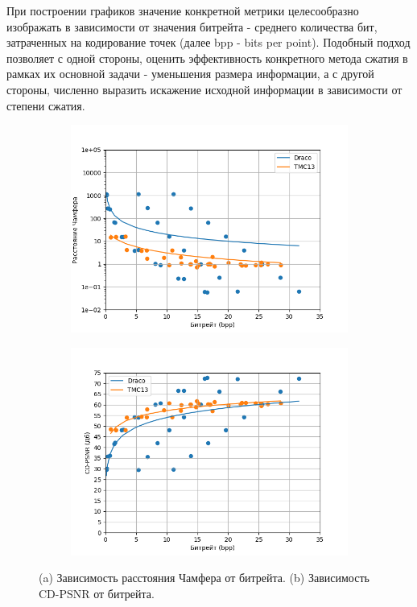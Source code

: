 При построении графиков значение конкретной метрики целесообразно изображать в
зависимости от значения битрейта - среднего количества бит, затраченных на
кодирование точек (далее bpp - bits per point). Подобный подход позволяет с
одной стороны, оценить эффективность конкретного метода сжатия в рамках их
основной задачи - уменьшения размера информации, а с другой стороны, численно
выразить искажение исходной информации в зависимости от степени сжатия.

\begin{figure}[H]
    \centering
    \begin{subfigure}{0.49\textwidth}
        \includegraphics[width=\linewidth]{assets/pcc_arena/approx_cd_p2pt.png}
        \caption{}
    \end{subfigure}
    \begin{subfigure}{0.49\textwidth}
        \includegraphics[width=\linewidth]{assets/pcc_arena/approx_cdpsnr_p2pt.png}
        \caption{}
    \end{subfigure}
    \caption{ (a) Зависимость расстояния Чамфера от битрейта. (b) Зависимость
    CD-PSNR от битрейта. }
    \label{img:pcc_arena_cd_bpp}
\end{figure}

